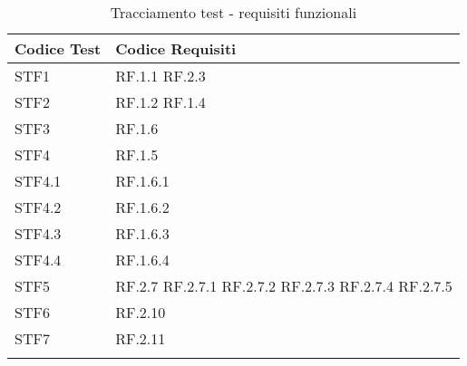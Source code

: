     \begin{longtable}{|p{3cm}|p{10cm}|} \hline
        \textbf{Codice Test} & \textbf{Codice Requisiti} \\ \hline
        STF1 & RF.1.1 RF.2.3\\ \hline
        STF2 & RF.1.2 RF.1.4 \\ \hline
        STF3 & RF.1.6 \\ \hline
        STF4 & RF.1.5 \\ \hline
        STF4.1 & RF.1.6.1 \\ \hline
        STF4.2 & RF.1.6.2 \\ \hline
        STF4.3 & RF.1.6.3 \\ \hline
        STF4.4 & RF.1.6.4 \\ \hline
        STF5 & RF.2.7 RF.2.7.1 RF.2.7.2 RF.2.7.3 RF.2.7.4 RF.2.7.5\\ \hline
        STF6 & RF.2.10 \\ \hline
        STF7 & RF.2.11 \\ \hline
        \caption{Tracciamento test - requisiti funzionali}
    \end{longtable}
